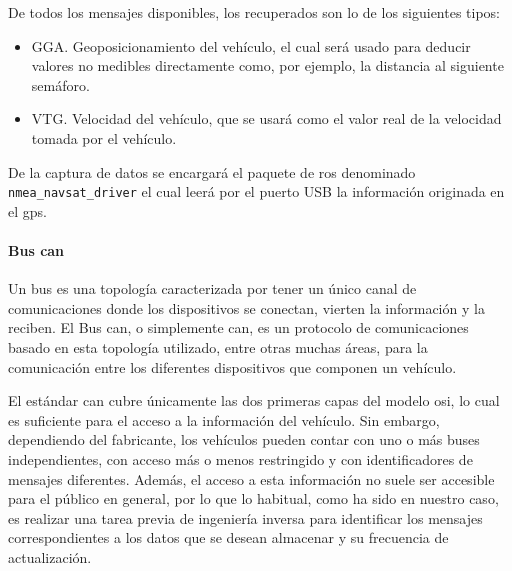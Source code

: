 De todos los mensajes disponibles, los recuperados son lo de los siguientes tipos:

\begin{itemize}
	\item GGA. Geoposicionamiento del vehículo, el cual será usado para deducir valores no medibles directamente como, por ejemplo, la distancia al siguiente semáforo.
	\item VTG. Velocidad del vehículo, que se usará como el valor real de la velocidad tomada por el vehículo.
\end{itemize}

De la captura de datos se encargará el paquete de \ac{ros} denominado \texttt{nmea\_navsat\_driver}  el cual leerá por el puerto USB la información originada en el \Acrshort{gps}.

\paragraph{Bus \Acrshort{can}}

Un bus es una topología caracterizada por tener un único canal de comunicaciones donde los dispositivos se conectan, vierten la información y la reciben. El Bus \Acrshort{can}, o simplemente \Acrshort{can}, es un protocolo de comunicaciones basado en esta topología utilizado, entre otras muchas áreas, para la comunicación entre los diferentes dispositivos que componen un vehículo.

El estándar \Acrshort{can} cubre únicamente las dos primeras capas del modelo \ac{osi}, lo cual es suficiente para el acceso a la información del vehículo. Sin embargo, dependiendo del fabricante, los vehículos pueden contar con uno o más buses independientes, con acceso más o menos restringido y con identificadores de mensajes diferentes. Además, el acceso a esta información no suele ser accesible para el público en general, por lo que lo habitual, como ha sido en nuestro caso, es realizar una tarea previa de ingeniería inversa para identificar los mensajes correspondientes a los datos que se desean almacenar y su frecuencia de actualización.

